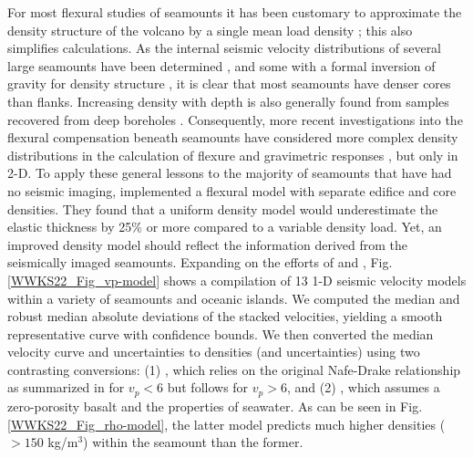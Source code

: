 For most flexural studies of seamounts it has been customary to approximate the density structure of the
volcano by a single mean load density \citep[e.g.,~][]{WC74,WSSW06}; this also simplifies calculations.
As the internal seismic velocity distributions of several large seamounts have been determined \citep[e.g.,~][]{W1985,H1994,C1995,W1997,C1999,W1999,G2001,K2002,EMH05,C2009,W2021},
and some with a formal inversion of gravity for density structure \citep[e.g.,~][]{H1991}, it is clear that most seamounts have denser
cores than flanks.  Increasing density with depth is also generally found from samples recovered from deep boreholes
\citep[e.g.,~][]{JM2001,H1979}.
Consequently, more recent investigations into the flexural compensation beneath seamounts have considered more complex
density distributions in the calculation of flexure and gravimetric responses \citep[e.g.,~][]{C2009,W2021}, but only in 2-D. To apply
these general lessons to the majority of seamounts that have had no seismic imaging, \citet{KW2010} implemented a flexural
model with separate edifice and core densities. They found that a uniform density model would underestimate the elastic thickness
by 25\% or more compared to a variable density load.  Yet, an improved density model should reflect the information derived
from the seismically imaged seamounts.  Expanding on the efforts of \citet{M2001} and \citet{W2021}, Fig. \ref{WWKS22_Fig_vp-model}
shows a compilation of 13 1-D seismic velocity models within a variety of seamounts and oceanic islands.  We computed
the median and robust median absolute deviations of the stacked velocities, yielding a smooth representative curve with confidence bounds.
We then converted the median velocity curve and uncertainties to densities (and uncertainties) using two contrasting conversions:
(1) \citet{B2005}, which relies on the original Nafe-Drake relationship as summarized in \citet{LND70}
for $v_p < 6$ but follows \citet{CM1995} for $v_p >6$, and (2) \citet{CR1984}, which assumes a zero-porosity basalt and the properties of seawater.
As can be seen in Fig. \ref{WWKS22_Fig_rho-model}, the latter model predicts much higher densities ($> 150$ kg/m$^3$) within the seamount
than the former.

